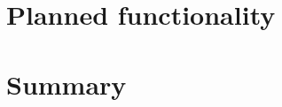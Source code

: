 \documentclass[traditabstract]{aa}
\begin{document}
\label{sec:workflow}




\section{Planned functionality}

\label{sec:future}



\section{Summary}

\label{sec:summary}




\end{document}
